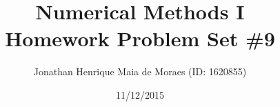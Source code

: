 \title{Numerical Methods I \\ Homework Problem Set \#9}
\author{Jonathan Henrique Maia de Moraes (ID: 1620855)}
\date{11/12/2015}
\maketitle

